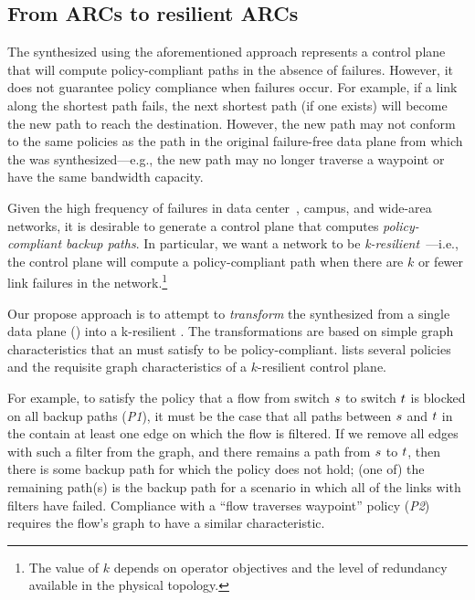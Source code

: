 \subsection{From ARCs to resilient ARCs} \label{sec:phase3}


The \ARC synthesized using the aforementioned approach represents a control
plane that will compute policy-compliant paths in the absence of failures.
However, it does not guarantee policy compliance when failures occur. For
example, if a link along the shortest path fails, the next shortest path (if
one exists) will become the new path to reach the destination. However, the
new path may not conform to the same policies as the path in the original
failure-free data plane from which the \ARC was synthesized---e.g., the new
path may no longer traverse a waypoint or have the same bandwidth capacity.

Given the high frequency of failures in data center~\cite{datacenterfailures},
campus, and wide-area~\cite{turner10:sigcomm} networks, it is desirable to
generate a control plane that computes {\em policy-compliant backup paths}.
In particular, we want a network to be {\em k-resilient}~\cite{plinko}---i.e.,
the control plane will compute a policy-compliant path when there are $k$ or
fewer link failures in the network.\footnote{The value of $k$ depends on
operator objectives and the level of redundancy available in the physical
topology.} 




Our propose  approach is to attempt to {\em transform} the \ARC synthesized from a single
data plane () into a k-resilient \ARC.
The transformations are based on simple graph characteristics that an \ARC
must satisfy to be policy-compliant.  
lists several policies and the requisite graph characteristics of a
$k$-resilient control plane. 

For example, to satisfy the policy that a flow from switch $s$ to
switch $t$ is blocked on all backup paths ({\em P1}), it must be the
case that all paths between $s$ and $t$ in the \ARC contain
at least one edge on which the flow is filtered. If we remove all edges with
such a filter from the graph, and there remains a path from $s$ to
$t$, then there is some backup path for which the policy does not
hold; (one of) the remaining path(s) is the backup path for a scenario in
which all of the links with filters have failed. Compliance with a ``flow
traverses waypoint'' policy ({\em P2}) requires the flow's graph to have a
similar characteristic.


